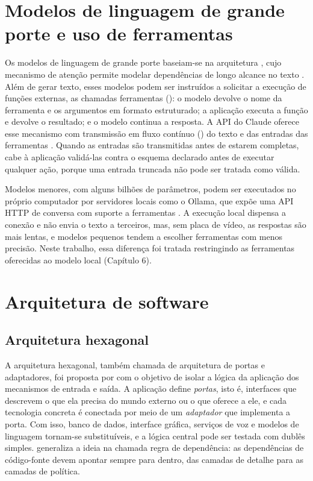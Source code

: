 \section{Modelos de linguagem de grande porte e uso de ferramentas}

Os modelos de linguagem de grande porte baseiam-se na arquitetura , cujo mecanismo de
atenção permite modelar dependências de longo alcance no texto \cite{vaswani2017}. Além de gerar texto,
esses modelos podem ser instruídos a solicitar a execução de funções externas, as chamadas ferramentas
(): o modelo devolve o nome da ferramenta e os argumentos em formato estruturado; a aplicação
executa a função e devolve o resultado; e o modelo continua a resposta. A API do Claude oferece esse
mecanismo com transmissão em fluxo contínuo () do texto e das entradas das ferramentas
\cite{anthropic}. Quando as entradas são transmitidas antes de estarem completas, cabe à aplicação
validá-las contra o esquema declarado antes de executar qualquer ação, porque uma entrada truncada não
pode ser tratada como válida.

Modelos menores, com alguns bilhões de parâmetros, podem ser executados no próprio computador por
servidores locais como o Ollama, que expõe uma API HTTP de conversa com suporte a ferramentas
\cite{ollama}. A execução local dispensa a conexão e não envia o texto a terceiros, mas, sem placa de
vídeo, as respostas são mais lentas, e modelos pequenos tendem a escolher ferramentas com menos
precisão. Neste trabalho, essa diferença foi tratada restringindo as ferramentas oferecidas ao modelo
local (Capítulo 6).

\section{Arquitetura de software}

\subsection{Arquitetura hexagonal}

A arquitetura hexagonal, também chamada de arquitetura de portas e adaptadores, foi proposta por
\textcite{cockburn2005} com o objetivo de isolar a lógica da aplicação dos mecanismos de entrada e
saída. A aplicação define \emph{portas}, isto é, interfaces que descrevem o que ela precisa do mundo
externo ou o que oferece a ele, e cada tecnologia concreta é conectada por meio de um
\emph{adaptador} que implementa a porta. Com isso, banco de dados, interface gráfica, serviços de
voz e modelos de linguagem tornam-se substituíveis, e a lógica central pode ser testada com dublês
simples. \textcite{martin2019} generaliza a ideia na chamada regra de dependência: as dependências de
código-fonte devem apontar sempre para dentro, das camadas de detalhe para as camadas de política.

